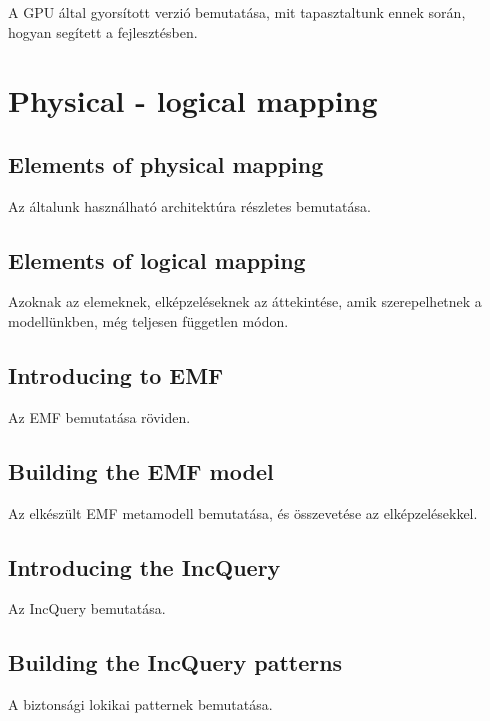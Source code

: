 \subsubsection{}
A GPU által gyorsított verzió bemutatása, mit tapasztaltunk ennek során, hogyan segített a fejlesztésben.

\section{Physical - logical mapping}
	\subsection{Elements of physical mapping}
		Az általunk használható architektúra részletes bemutatása.
	\subsection{Elements of logical mapping}
		Azoknak az elemeknek, elképzeléseknek az áttekintése, amik szerepelhetnek a modellünkben, még teljesen független módon.
	\subsection{Introducing to EMF}
		Az EMF bemutatása röviden.
	\subsection{Building the EMF model}
		Az elkészült EMF metamodell bemutatása, és összevetése az elképzelésekkel.
	\subsection{Introducing the IncQuery}
		Az IncQuery bemutatása.
	\subsection{Building the IncQuery patterns}
		A biztonsági lokikai patternek bemutatása.